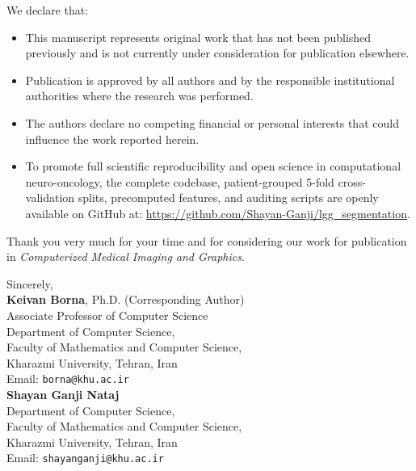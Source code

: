 \documentclass[11pt]{article}
\begin{document}
\vspace{0.6em}
We declare that:
\begin{itemize}
    \item This manuscript represents original work that has not been published previously and is not currently under consideration for publication elsewhere.
    \item Publication is approved by all authors and by the responsible institutional authorities where the research was performed.
    \item The authors declare no competing financial or personal interests that could influence the work reported herein.
    \item To promote full scientific reproducibility and open science in computational neuro-oncology, the complete codebase, patient-grouped 5-fold cross-validation splits, precomputed features, and auditing scripts are openly available on GitHub at: \url{https://github.com/Shayan-Ganji/lgg_segmentation}.
\end{itemize}

\vspace{0.6em}
Thank you very much for your time and for considering our work for publication in \textit{Computerized Medical Imaging and Graphics}.

\vspace{1.2em}
\noindent
Sincerely,\\
\textbf{Keivan Borna}, Ph.D. (Corresponding Author)\\
Associate Professor of Computer Science\\
Department of Computer Science,\\
Faculty of Mathematics and Computer Science,\\
Kharazmi University, Tehran, Iran\\
Email: \texttt{borna@khu.ac.ir}\\[1.0em]
\textbf{Shayan Ganji Nataj}\\
Department of Computer Science,\\
Faculty of Mathematics and Computer Science,\\
Kharazmi University, Tehran, Iran\\
Email: \texttt{shayanganji@khu.ac.ir}
\end{document}
